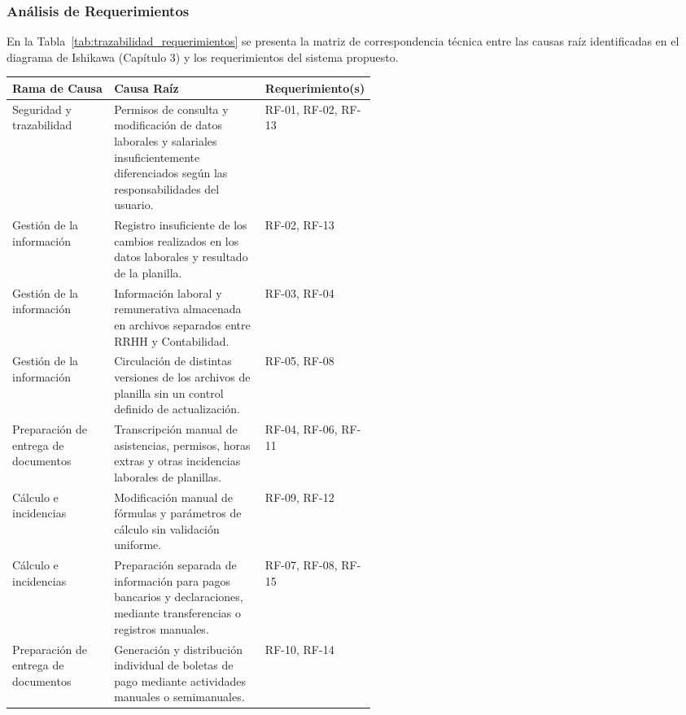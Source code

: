 \subsubsection{Análisis de Requerimientos}

En la Tabla~\ref{tab:trazabilidad_requerimientos} se presenta la matriz de correspondencia técnica 
entre las causas raíz identificadas en el diagrama de Ishikawa (Capítulo 3) 
y los requerimientos del sistema propuesto.

\par
\noindent
\begin{minipage}{\linewidth}

    \begingroup
    \renewcommand{\baselinestretch}{1}
    \footnotesize
    \setlength{\tabcolsep}{4pt}
    \renewcommand{\arraystretch}{1.2}

    \begin{tabularx}{\linewidth}{@{}p{0.28\linewidth}Xp{0.24\linewidth}@{}}
        \toprule
        \textbf{Rama de Causa} & \textbf{Causa Raíz} & \textbf{Requerimiento(s)} \\ \midrule
        Seguridad y trazabilidad & Permisos de consulta y modificación de datos laborales y salariales insuficientemente diferenciados según las responsabilidades del usuario. & RF-01, RF-02, RF-13 \\ \addlinespace
        Gestión de la información & Registro insuficiente de los cambios realizados en los datos laborales y resultado de la planilla. & RF-02, RF-13 \\ \addlinespace
        Gestión de la información & Información laboral y remunerativa almacenada en archivos separados entre RRHH y Contabilidad. & RF-03, RF-04 \\ \addlinespace
        Gestión de la información & Circulación de distintas versiones de los archivos de planilla sin un control definido de actualización. & RF-05, RF-08 \\ \addlinespace
        Preparación de entrega de documentos & Transcripción manual de asistencias, permisos, horas extras y otras incidencias laborales de planillas. & RF-04, RF-06, RF-11 \\ \addlinespace
        Cálculo e incidencias & Modificación manual de fórmulas y parámetros de cálculo sin validación uniforme. & RF-09, RF-12 \\ \addlinespace
        Cálculo e incidencias & Preparación separada de información para pagos bancarios y declaraciones, mediante transferencias o registros manuales. & RF-07, RF-08, RF-15 \\ \addlinespace
        Preparación de entrega de documentos & Generación y distribución individual de boletas de pago mediante actividades manuales o semimanuales. & RF-10, RF-14 \\ \bottomrule
    \end{tabularx}
    \endgroup

\end{minipage}
\finBloqueAPA

